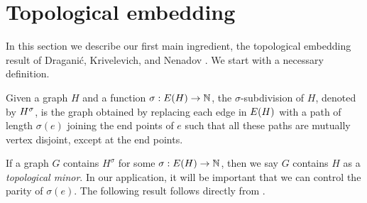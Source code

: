 \documentclass[11pt]{article}
\begin{document}




\section{Topological embedding}
\label{sec:embed-machinery}

In this section we describe our first main ingredient, the topological embedding result of Dragani\'c, Krivelevich, and Nenadov \cite{draganic22rolling}. We start with a necessary definition.

\begin{definition}\label{def:subdivisions}
Given a graph $H$ and a function $\sigma: E(H) \rightarrow \mathbb{N}$, the $\sigma$-subdivision of $H$, denoted by ${H}^{\sigma}$, is the graph obtained by replacing each edge in $E(H)$ with a path of length $\sigma(e)$ joining the end points of $e$ such that all these paths are mutually vertex disjoint, except at the end points.
\end{definition}

If a graph $G$ contains $H^{\sigma}$ for some $\sigma: E(H) \to \mathbb{N}$, then we say $G$ contains $H$ as a \emph{topological minor}. In our application, it will be important that we can control the parity of $\sigma(e)$. The following result follows directly from \cite[Theorem 1]{draganic22rolling}. 

\end{document}
